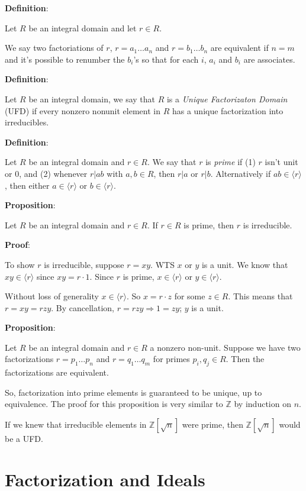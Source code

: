 \documentclass{article}
\begin{document}
\begin{multicols*}{2}
\textbf{Definition}:

Let $R$ be an integral domain and let $r \in R$.

We say two factoriations of $r$, $r = a_1 \dots a_n$ and $r = b_1 \dots b_n$ are equivalent if $n=m$ and it's possible to renumber the $b_i$'s so that for each $i$, $a_i$ and $b_i$ are associates.

\textbf{Definition}:

Let $R$ be an integral domain, we say that $R$ is a \textit{Unique Factorizaton Domain} (UFD) if every nonzero nonunit element in $R$ has a unique factorization into irreducibles.

\textbf{Definition}:

Let $R$ be an integral domain and $r \in R$. We say that $r$ is \textit{prime} if (1) $r$ isn't unit or 0, and (2) whenever $r | ab$ with $a, b \in R$, then $r | a$ or $r | b$. Alternatively if $ab \in \langle r \rangle$, then either $a \in \langle r \rangle$ or $b \in \langle r \rangle$.

\textbf{Proposition}:


Let $R$ be an integral domain and $r \in R$. If $r \in R$ is prime, then $r$ is irreducible.

\textbf{Proof}:

To show $r$ is irreducible, suppose $r = xy$. WTS $x$ or $y$ is a unit. We know that $xy \in \langle r \rangle$ since $xy = r \cdot 1$. Since $r$ is prime, $x \in \langle r \rangle$ or $y \in \langle r \rangle$. 

Without loss of generality $x \in \langle r \rangle$. So $x = r \cdot z$ for some $z \in R$. This means that $r = xy = rzy$. By cancellation, $r = rzy \Rightarrow 1 = zy$; $y$ is a unit.

\textbf{Proposition}:

Let $R$ be an integral domain and $r \in R$ a nonzero non-unit. Suppose we have two factorizations $r = p_1 \dots p_n$ and $r = q_1 \dots q_m$ for primes $p_i, q_j \in R$. Then the factorizations are equivalent.

So, factorization into prime elements is guaranteed to be unique, up to equivalence. The proof for this proposition is very similar to $\mathbb{Z}$ by induction on $n$.

If we knew that irreducible elements in $\mathbb{Z}[\sqrt{n}]$ were prime, then $\mathbb{Z}[\sqrt{n}]$ would be a UFD.


\section{Factorization and Ideals}


\end{multicols*}
\end{document}
